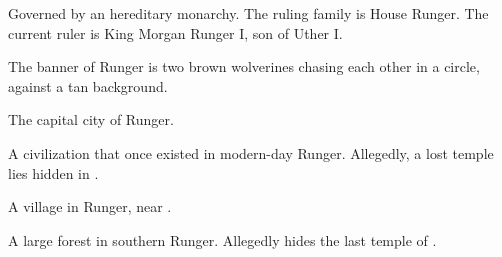 \begin{gloss}

Governed by an hereditary monarchy. 
The ruling family is House Runger. 
The current ruler is King {Morgan Runger} I, son of Uther I. 

The banner of Runger is two brown wolverines chasing each other in a circle, against a tan background.





\begin{subgloss}
  \begin{comment}
  \subparagraph{Dormina}
  \end{comment}
  The capital city of Runger.
  
  
  
  
  
  
  \begin{comment}
  \subparagraph{\EreshKal}
  \end{comment}
  \gitem{\EreshKal}
  \index{\EreshKal}
  A  civilization that once existed in modern-day Runger.
  Allegedly, a lost \EreshKali{} temple lies hidden in .  

  
  
  
  
  
  \begin{comment}
  \subparagraph{Gedrock}
  \end{comment}
  A village in Runger, near . 
  
  
  
  
  
  
  \begin{comment}
  \subparagraph{Waythane Forest}
  \end{comment}
  A large forest in southern Runger. 
  Allegedly hides the last temple of . 

  
  
  
  
  
\end{subgloss}







\begin{comment}

\end{comment}
\end{gloss}
